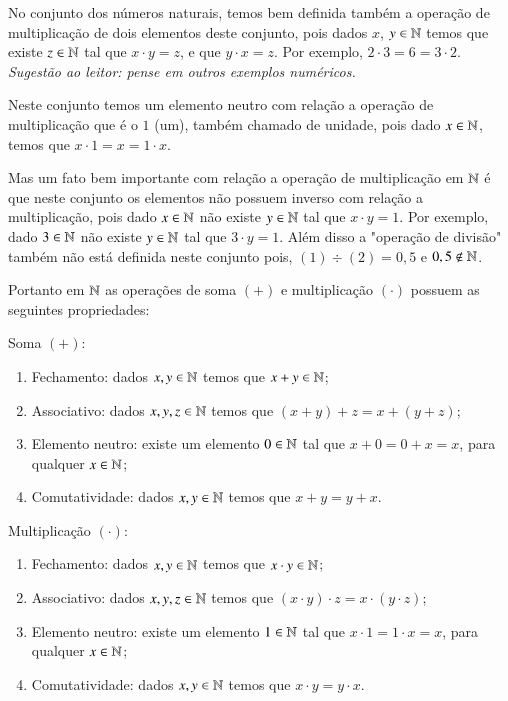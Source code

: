  No conjunto dos números naturais, temos bem definida também a operação de multiplicação de dois elementos deste conjunto, pois dados $x$, $y \in \mathbb{N}$ temos que existe $z \in \mathbb{N}$ tal que $x \cdot y=z$, e que $y \cdot x=z$. Por exemplo, $2 \cdot 3=6=3 \cdot2$. \emph{Sugestão ao leitor: pense em outros exemplos numéricos.}
 
 Neste conjunto temos um elemento neutro com relação a operação de multiplicação que é o $1$ (um), também chamado de unidade, pois dado $x \in \mathbb{N}$, temos que $x \cdot 1= x= 1 \cdot x$.

 Mas um fato bem importante com relação a operação de multiplicação em $\mathbb{N}$ é que neste conjunto os elementos não possuem inverso com relação a multiplicação, pois dado $x \in \mathbb{N}$ não existe $y \in \mathbb{N}$ tal que $x \cdot y= 1$. Por exemplo, dado $3 \in \mathbb{N}$ não existe $y \in \mathbb{N}$ tal que $3 \cdot y= 1$. Além disso a "operação de divisão" também não está definida neste conjunto pois, $(1)\div (2)= 0,5$ e $0,5 \notin \mathbb{N}$. 
 
  \vskip0.3cm
 
 Portanto em $\mathbb{N}$ as operações de soma $(+)$ e multiplicação $(\cdot)$ possuem as seguintes propriedades:
 
 Soma $(+)$:
 \begin{enumerate}[1)]
 \item Fechamento: dados $x, y \in \mathbb{N}$ temos que $x+y \in \mathbb{N}$;
 \item Associativo: dados $x, y, z \in \mathbb{N}$ temos que $(x+y)+z= x+(y+z)$;
 \item Elemento neutro: existe um elemento $0 \in \mathbb{N}$ tal que $x+0=0+x=x$, para qualquer $x \in \mathbb{N}$;
 \item Comutatividade: dados $x, y \in \mathbb{N}$ temos que $x+y= y+x$.
 \end{enumerate}
 
  Multiplicação $(\cdot)$:
 \begin{enumerate}[1)]
 \item Fechamento: dados $x, y \in \mathbb{N}$ temos que $x \cdot y \in \mathbb{N}$;
 \item Associativo: dados $x, y, z \in \mathbb{N}$ temos que $(x \cdot y) \cdot z= x \cdot (y \cdot z)$;
 \item Elemento neutro: existe um elemento $1 \in \mathbb{N}$ tal que $x \cdot 1= 1 \cdot x= x$, para qualquer $x \in \mathbb{N}$;
 \item Comutatividade: dados $x, y \in \mathbb{N}$ temos que $x \cdot y= y \cdot x$.
 \end{enumerate}
 
